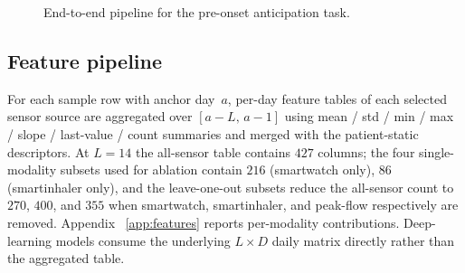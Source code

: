 \documentclass[11pt,a4paper]{article}
\begin{document}
\begin{figure}[H]
\centering
{}
\caption{End-to-end pipeline for the pre-onset anticipation task.}
\label{fig:pipeline}
\end{figure}

\subsection{Feature pipeline}

For each sample row with anchor day~$a$, per-day feature tables of
each selected sensor source are aggregated over $[a-L,\,a-1]$ using
mean / std / min / max / slope / last-value / count summaries and
merged with the patient-static descriptors.  At $L=14$ the
all-sensor table contains $427$ columns; the four single-modality
subsets used for ablation contain $216$ (smartwatch only),
$86$ (smartinhaler only), and the leave-one-out subsets reduce
the all-sensor count to $270$, $400$, and $355$ when smartwatch,
smartinhaler, and peak-flow respectively are removed.  Appendix~%
\ref{app:features} reports per-modality contributions.
Deep-learning models consume the underlying $L\times D$ daily
matrix directly rather than the aggregated table.
\end{document}

